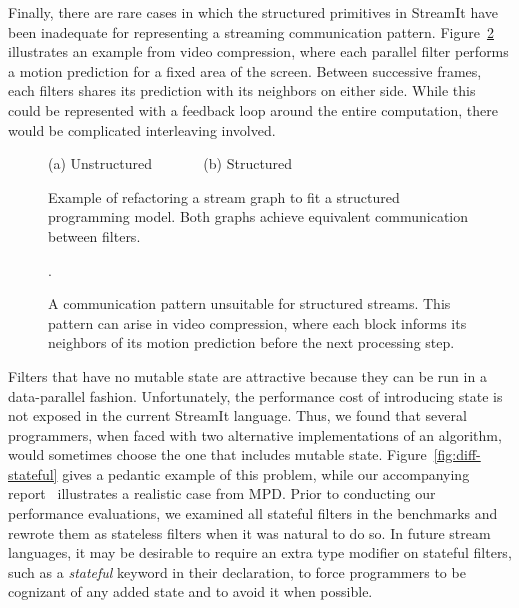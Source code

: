 Finally, there are rare cases in which the structured primitives in
StreamIt have been inadequate for representing a streaming
communication pattern.  Figure~\ref{fig:inadequate} illustrates an
example from video compression, where each parallel filter performs a
motion prediction for a fixed area of the screen.  Between successive
frames, each filters shares its prediction with its neighbors on
either side.  While this could be represented with a feedback loop
around the entire computation, there would be complicated interleaving
involved.

\begin{figure}[t]
\centering
{}

(a) Unstructured ~~~~~~ (b) Structured~~~~
\caption[Refactoring a stream graph to fit a structured programming
  model.]{Example of refactoring a stream graph to fit a structured
  programming model.  Both graphs achieve equivalent communication
  between filters.
\protect\label{fig:interleaving}}
\end{figure}

\begin{figure}[t]
\centering
{}

\caption[A communication pattern unsuitable for structured streams.]{A
  communication pattern unsuitable for structured streams.  This
  pattern can arise in video compression, where each block informs its
  neighbors of its motion prediction before the next processing
  step.\protect\label{fig:inadequate}}.
\end{figure}

\myitem {\accidentalstate} Filters that have no mutable state are
attractive because they can be run in a data-parallel fashion.
Unfortunately, the performance cost of introducing state is not
exposed in the current StreamIt language.  Thus, we found that several
programmers, when faced with two alternative implementations of an
algorithm, would sometimes choose the one that includes mutable state.
Figure~\ref{fig:diff-stateful} gives a pedantic example of this
problem, while our accompanying report~\cite{thies-thesis} illustrates
a realistic case from MPD.  Prior to conducting our performance
evaluations, we examined all stateful filters in the benchmarks and
rewrote them as stateless filters when it was natural to do so.  In
future stream languages, it may be desirable to require an extra type
modifier on stateful filters, such as a {\it stateful} keyword in
their declaration, to force programmers to be cognizant of any added
state and to avoid it when possible.
\label{sec:accidentalstate}

